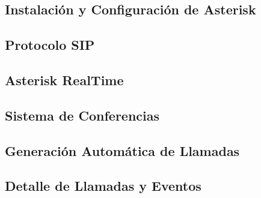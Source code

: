 \subsection*{Instalación y Configuración de Asterisk}



\subsection*{Protocolo SIP}



\subsection*{Asterisk RealTime}









\subsection*{Sistema de Conferencias}



\subsection*{Generación Automática de Llamadas}





\subsection*{Detalle de Llamadas y Eventos}

